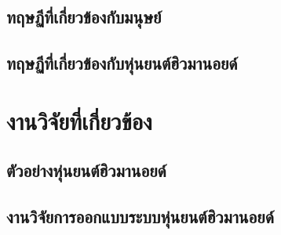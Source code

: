 \clearpage
\subsection{ทฤษฏีที่เกี่ยวข้องกับมนุษย์}


\subsection{ทฤษฏีที่เกี่ยวข้องกับหุ่นยนต์ฮิวมานอยด์}


\clearpage
\section{งานวิจัยที่เกี่ยวข้อง}
\subsection{ตัวอย่างหุ่นยนต์ฮิวมานอยด์}


\clearpage
\subsection{งานวิจัยการออกแบบระบบหุ่นยนต์ฮิวมานอยด์}


